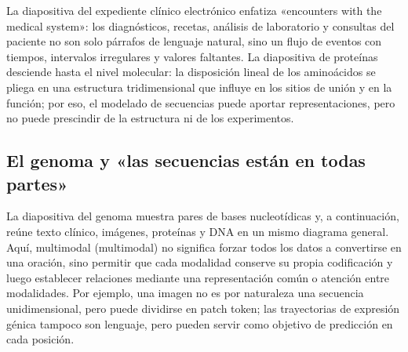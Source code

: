 La diapositiva del expediente clínico electrónico enfatiza «encounters with the medical system»: los diagnósticos, recetas, análisis de laboratorio y consultas del paciente no son solo párrafos de lenguaje natural, sino un flujo de eventos con tiempos, intervalos irregulares y valores faltantes. La diapositiva de proteínas desciende hasta el nivel molecular: la disposición lineal de los aminoácidos se pliega en una estructura tridimensional que influye en los sitios de unión y en la función; por eso, el modelado de secuencias puede aportar representaciones, pero no puede prescindir de la estructura ni de los experimentos.




\subsection{El genoma y «las secuencias están en todas partes»}

La diapositiva del genoma muestra pares de bases nucleotídicas y, a continuación, reúne texto clínico, imágenes, proteínas y DNA en un mismo diagrama general. Aquí, multimodal (multimodal) no significa forzar todos los datos a convertirse en una oración, sino permitir que cada modalidad conserve su propia codificación y luego establecer relaciones mediante una representación común o atención entre modalidades. Por ejemplo, una imagen no es por naturaleza una secuencia unidimensional, pero puede dividirse en patch token; las trayectorias de expresión génica tampoco son lenguaje, pero pueden servir como objetivo de predicción en cada posición.



